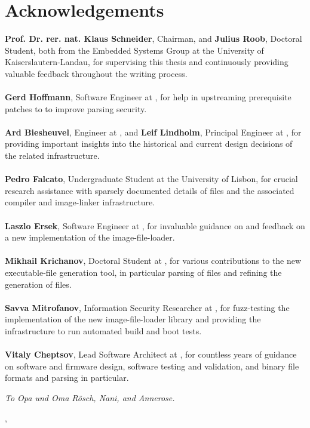 \begingroup
\renewcommand{\cleardoublepage}{}
\clearpage
{}
\chapter*{Acknowledgements}
\endgroup

\noindent\textbf{Prof. Dr. rer. nat. Klaus Schneider}, Chairman, and \textbf{Julius Roob}, Doctoral Student, both from the Embedded Systems Group at the University of Kaiserslautern-Landau, for supervising this thesis and continuously providing valuable feedback throughout the writing process.\\
\\
\textbf{Gerd Hoffmann}, Software Engineer at , for help in upstreaming prerequisite patches to  to improve parsing security.\\
\\
\textbf{Ard Biesheuvel}, Engineer at , and \textbf{Leif Lindholm}, Principal Engineer at , for providing important insights into the historical and current design decisions of the related  infrastructure.\\
\\
\textbf{Pedro Falcato}, Undergraduate Student at the University of Lisbon, for crucial research assistance with sparsely documented details of  files and the associated compiler and \gls{image-linker} infrastructure.\\
\\
\textbf{Laszlo Ersek}, Software Engineer at , for invaluable guidance on  and feedback on a new implementation of the  \gls{image-file-loader}.\\
\\
\textbf{Mikhail Krichanov}, Doctoral Student at , for various contributions to the new \gls{executable-file} generation tool, in particular parsing of  files and refining the generation of  files.\\
\\
\textbf{Savva Mitrofanov}, Information Security Researcher at , for \gls{fuzz-testing} the  implementation of the new  \gls{image-file-loader} library and providing the  infrastructure to run automated build and boot tests.\\
\\
\textbf{Vitaly Cheptsov}, Lead Software Architect at , for countless years of guidance on software and \gls{firmware} design, software testing and validation, and binary file formats and parsing in particular.

\vspace{1cm}

\hfill \textit{To Opa und Oma R{\"o}sch, Nani, and Annerose.}

\vspace{1cm}

\hfill \makeatletter\@date, \@author\makeatother

